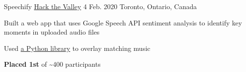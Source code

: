\begin{cventries}
  \cventry
    {Speechify} %
    {\href{https://hackthevalley.io/}{Hack the Valley} 4} %
    {Feb. 2020} %
    {Toronto, Ontario, Canada} %
    {
      \begin{cvitems} %
        \item{Built a web app that uses Google Speech API sentiment analysis to identify key moments in uploaded audio files}
        \item{Used \href{https://pypi.org/project/pydub/}{a Python library} to overlay matching music}
        \item {\textbf{Placed 1st}  of \textasciitilde 400 participants}
      \end{cvitems}
    }

\end{cventries}
